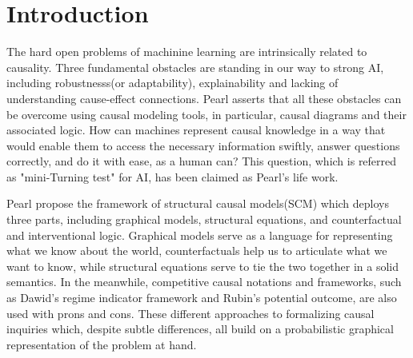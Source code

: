 \section{Introduction}
 
The hard open problems of machinine learning are intrinsically related to causality\cite{Scholkopf2019}.  Three fundamental obstacles are standing in our way to strong AI, including robustnesss(or adaptability), explainability and lacking of understanding cause-effect connections.  Pearl  asserts that all these obstacles can be overcome using causal modeling tools, in particular, causal diagrams  and their associated logic\cite{Pearl2019seven}.  %
How can machines represent causal knowledge in a way that would enable them to access the necessary information swiftly, answer questions correctly, and do it with ease, as a human can? This question, which is referred as "mini-Turning test" for AI, has been claimed as Pearl's life work\cite{Pearl2018}. 


 

Pearl propose the framework of structural causal models(SCM) which deploys three parts, including graphical models, structural equations, and counterfactual and interventional logic. Graphical models serve as a language for representing what we know about the world, counterfactuals help us to articulate what we want to know, while structural equations serve to tie the two together in a solid semantics. In the meanwhile, competitive causal notations and frameworks, such as Dawid's regime indicator framework and Rubin's potential outcome, are also used with prons and cons\cite{Marloes2018, MigualA.Hernan2019, Imbens2015}. These different approaches to formalizing causal inquiries which, despite subtle differences, all build on a probabilistic graphical representation of the problem at hand. 


